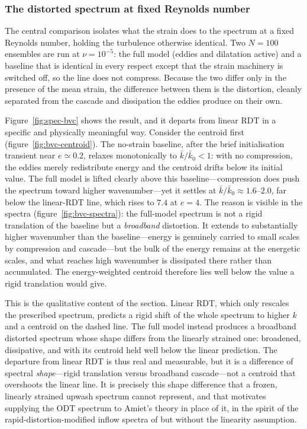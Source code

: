 \documentclass[lineno]{JFM-FLM_Au}
\newcounter{assumption}
\begin{document}
\subsubsection{The distorted spectrum at fixed Reynolds
number}\label{sec:spec-bvc}

The central comparison isolates what the strain does to the spectrum at a
fixed Reynolds number, holding the turbulence otherwise identical. Two
$N=100$ ensembles are run at $\nu=10^{-5}$: the full model (eddies and
dilatation active) and a baseline that is identical in every respect except
that the strain machinery is switched off, so the line does not compress.
Because the two differ only in the presence of the mean strain, the difference
between them is the distortion, cleanly separated from the cascade and
dissipation the eddies produce on their own.

Figure~\ref{fig:spec-bvc} shows the result, and it departs from linear RDT in a
specific and physically meaningful way. Consider the centroid first
(figure~\ref{fig:bvc-centroid}). The no-strain baseline, after the brief
initialisation transient near $e\simeq0.2$, relaxes monotonically to
$\bar k/\bar k_0<1$: with no compression, the eddies merely redistribute energy
and the centroid drifts below its initial value. The full model is lifted
clearly above this baseline---compression does push the spectrum toward higher
wavenumber---yet it settles at $\bar k/\bar k_0\approx1.6$--$2.0$, far below the
linear-RDT line, which rises to $7.4$ at $e=4$. The reason is visible in the
spectra (figure~\ref{fig:bvc-spectra}): the full-model spectrum is not a rigid
translation of the baseline but a \emph{broadband} distortion. It extends to
substantially higher wavenumber than the baseline---energy is genuinely carried
to small scales by compression and cascade---but the bulk of the energy remains
at the energetic scales, and what reaches high wavenumber is dissipated there
rather than accumulated. The energy-weighted centroid therefore lies well below
the value a rigid translation would give.

This is the qualitative content of the section. Linear RDT, which only
rescales the prescribed spectrum, predicts a rigid shift of the whole spectrum
to higher $k$ and a centroid on the dashed line. The full model instead
produces a broadband distorted spectrum whose shape differs from the linearly
strained one: broadened, dissipative, and with its centroid held well below the
linear prediction. The departure from linear RDT is thus real and measurable,
but it is a difference of spectral \emph{shape}---rigid translation versus
broadband cascade---not a centroid that overshoots the linear line. It is
precisely this shape difference that a frozen, linearly strained upwash
spectrum cannot represent, and that motivates supplying the ODT spectrum to
Amiet's theory in place of it, in the spirit of the rapid-distortion-modified
inflow spectra of \citet{deSantana2016} but without the linearity assumption.
\end{document}
